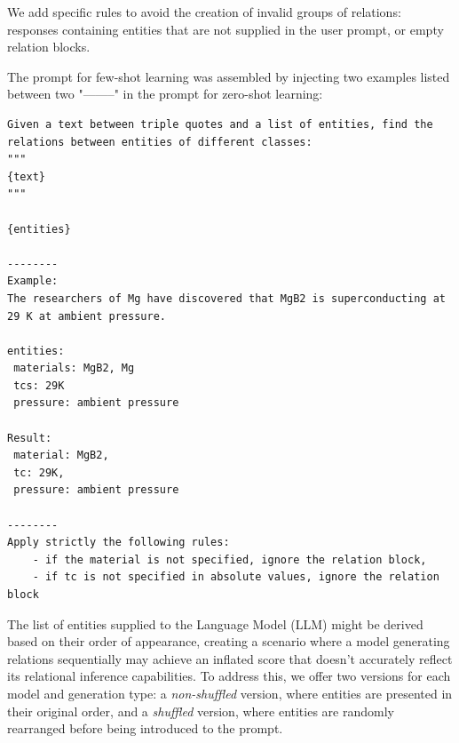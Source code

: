 \documentclass[a4paper]{article}
\begin{document}
We add specific rules to avoid the creation of invalid groups of relations: responses containing entities that are not supplied in the user prompt, or empty relation blocks. 


    

The prompt for few-shot learning was assembled by injecting two examples listed between two "--------" in the prompt for zero-shot learning:

\begin{lstlisting}[caption=Few-shot training for extracting relations from lists of entities]
Given a text between triple quotes and a list of entities, find the relations between entities of different classes: 
"""
{text}
"""

{entities}

--------
Example: 
The researchers of Mg have discovered that MgB2 is superconducting at 29 K at ambient pressure.

entities:
 materials: MgB2, Mg
 tcs: 29K
 pressure: ambient pressure
 
Result: 
 material: MgB2, 
 tc: 29K, 
 pressure: ambient pressure
 
--------
Apply strictly the following rules:  
    - if the material is not specified, ignore the relation block,
    - if tc is not specified in absolute values, ignore the relation block 
\end{lstlisting}


The list of entities supplied to the Language Model (LLM) might be derived based on their order of appearance, creating a scenario where a model generating relations sequentially may achieve an inflated score that doesn't accurately reflect its relational inference capabilities. 
To address this, we offer two versions for each model and generation type: a \emph{non-shuffled} version, where entities are presented in their original order, and a \emph{shuffled} version, where entities are randomly rearranged before being introduced to the prompt.
\end{document}
